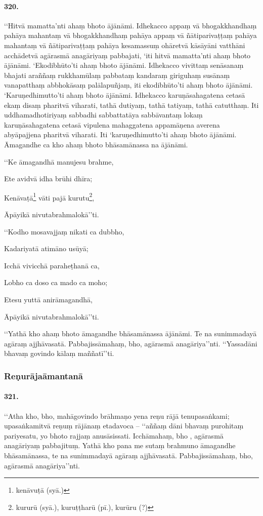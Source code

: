 \paragraph{320.} ‘‘Hitvā mamatta’nti ahaṃ bhoto ājānāmi. Idhekacco appaṃ vā bhogakkhandhaṃ pahāya mahantaṃ vā bhogakkhandhaṃ pahāya appaṃ vā ñātiparivaṭṭaṃ pahāya mahantaṃ vā ñātiparivaṭṭaṃ pahāya kesamassuṃ ohāretvā kāsāyāni vatthāni acchādetvā agārasmā anagāriyaṃ pabbajati, ‘iti hitvā mamatta’nti ahaṃ bhoto ājānāmi. ‘Ekodibhūto’ti ahaṃ bhoto ājānāmi. Idhekacco vivittaṃ senāsanaṃ bhajati araññaṃ rukkhamūlaṃ pabbataṃ kandaraṃ giriguhaṃ susānaṃ vanapatthaṃ abbhokāsaṃ palālapuñjaṃ, iti ekodibhūto’ti ahaṃ bhoto ājānāmi. ‘Karuṇedhimutto’ti ahaṃ bhoto ājānāmi. Idhekacco karuṇāsahagatena cetasā ekaṃ disaṃ pharitvā viharati, tathā dutiyaṃ, tathā tatiyaṃ, tathā catutthaṃ. Iti uddhamadhotiriyaṃ sabbadhi sabbattatāya sabbāvantaṃ lokaṃ karuṇāsahagatena cetasā vipulena mahaggatena appamāṇena averena abyāpajjena pharitvā viharati. Iti ‘karuṇedhimutto’ti ahaṃ bhoto ājānāmi. Āmagandhe ca kho ahaṃ bhoto bhāsamānassa na ājānāmi.

‘‘Ke āmagandhā manujesu brahme,

Ete avidvā idha brūhi dhīra;

Kenāvaṭā\footnote{kenāvuṭā (syā.)} vāti pajā kurutu\footnote{kururū (syā.), kuruṭṭharū (pī.), kurūru (?)},

Āpāyikā nivutabrahmalokā’’ti.

‘‘Kodho mosavajjaṃ nikati ca dubbho,

Kadariyatā atimāno usūyā;

Icchā vivicchā paraheṭhanā ca,

Lobho ca doso ca mado ca moho;

Etesu yuttā anirāmagandhā,

Āpāyikā nivutabrahmalokā’’ti.

‘‘Yathā kho ahaṃ bhoto āmagandhe bhāsamānassa ājānāmi. Te na sunimmadayā agāraṃ ajjhāvasatā. Pabbajissāmahaṃ, bho, agārasmā anagāriya’’nti. ‘‘Yassadāni bhavaṃ govindo kālaṃ maññatī’’ti.

\subsubsection{Reṇurājaāmantanā}

\paragraph{321.} ‘‘Atha kho, bho, mahāgovindo brāhmaṇo yena reṇu rājā tenupasaṅkami; upasaṅkamitvā reṇuṃ rājānaṃ etadavoca – ‘‘aññaṃ dāni bhavaṃ purohitaṃ pariyesatu, yo bhoto rajjaṃ anusāsissati. Icchāmahaṃ, bho , agārasmā anagāriyaṃ pabbajituṃ. Yathā kho pana me sutaṃ brahmuno āmagandhe bhāsamānassa, te na sunimmadayā agāraṃ ajjhāvasatā. Pabbajissāmahaṃ, bho, agārasmā anagāriya’’nti.

